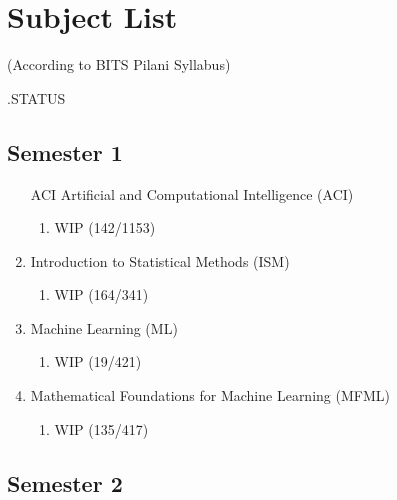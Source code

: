 \chapter*{Subject List}

\begin{center}
(According to BITS Pilani Syllabus)
\end{center}

.\hfill STATUS

\section*{Semester 1}
\begin{enumerate}
    \item[ACI] Artificial and Computational Intelligence (ACI)
        \begin{enumerate}
            \item {} 
            \hfill WIP (142/1153)
        \end{enumerate}

    \item Introduction to Statistical Methods (ISM)    
        \begin{enumerate}
            \item {} 
            \hfill WIP (164/341)
        \end{enumerate}

    \item Machine Learning (ML)
        \begin{enumerate}
            \item {} 
            \hfill WIP (19/421)
        \end{enumerate}
        
    \item Mathematical Foundations for Machine Learning (MFML)
        \begin{enumerate}
            \item {}
            \hfill WIP (135/417)
        \end{enumerate}
\end{enumerate}


\section*{Semester 2}

